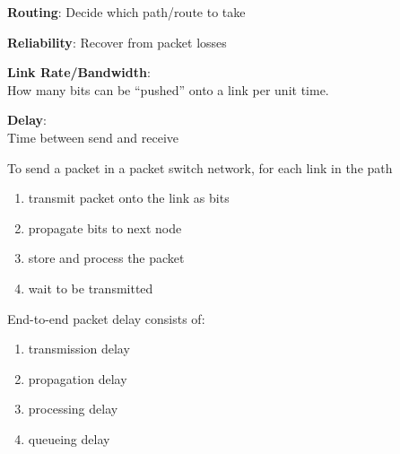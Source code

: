 \begin{frame} \begin{center}\large
\textbf{Routing}: Decide which path/route to take
\end{center}\end{frame}

\begin{frame}\begin{center}\large
\textbf{Reliability}: Recover from packet losses
\end{center}\end{frame}

\begin{frame}\begin{center}\large
\textbf{Link Rate/Bandwidth}:\\ How many bits can be ``pushed'' onto a link per unit time.
\end{center}\end{frame}

\begin{frame}\begin{center}\large
\textbf{Delay}:\\ Time between send and receive
\end{center}\end{frame}

\begin{frame}\normalsize
To send a packet in a packet switch network, for each link in the path
\begin{enumerate}
\item transmit packet onto the link as bits
\item propagate bits to next node
\item store and process the packet
\item wait to be transmitted
\end{enumerate}
\end{frame}

\begin{frame}\normalsize
End-to-end packet delay consists of:
\begin{enumerate}
\item transmission delay
\item propagation delay
\item processing delay
\item queueing delay
\end{enumerate}
\end{frame}



